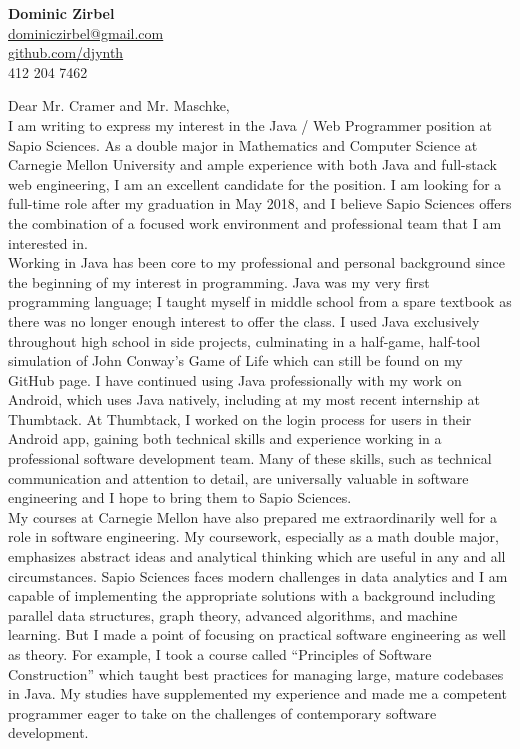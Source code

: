 \documentclass[letterpaper,10pt]{article}
\newcommand{\lb}{\vspace{14pt} \\}
\begin{document}
\thispagestyle{empty}

\begin{flushright}
    \textbf{\Large{Dominic Zirbel}} \\
    \href{mailto:dominiczirbel@gmail.com}{dominiczirbel@gmail.com} \\
    \href{https://github.com/djynth}{github.com/djynth} \\
    412 204 7462
\end{flushright}

\vspace{36pt}

Dear Mr. Cramer and Mr. Maschke,
\lb
I am writing to express my interest in the Java / Web Programmer position at Sapio Sciences. As a double major in Mathematics and Computer Science at Carnegie Mellon University and ample experience with both Java and full-stack web engineering, I am an excellent candidate for the position. I am looking for a full-time role after my graduation in May 2018, and I believe Sapio Sciences offers the combination of a focused work environment and professional team that I am interested in.
\lb
Working in Java has been core to my professional and personal background since the beginning of my interest in programming. Java was my very first programming language; I taught myself in middle school from a spare textbook as there was no longer enough interest to offer the class. I used Java exclusively throughout high school in side projects, culminating in a half-game, half-tool simulation of John Conway's Game of Life which can still be found on my GitHub page. I have continued using Java professionally with my work on Android, which uses Java natively, including at my most recent internship at Thumbtack. At Thumbtack, I worked on the login process for users in their Android app, gaining both technical skills and experience working in a professional software development team. Many of these skills, such as technical communication and attention to detail, are universally valuable in software engineering and I hope to bring them to Sapio Sciences.
\lb
My courses at Carnegie Mellon have also prepared me extraordinarily well for a role in software engineering. My coursework, especially as a math double major, emphasizes abstract ideas and analytical thinking which are useful in any and all circumstances. Sapio Sciences faces modern challenges in data analytics and I am capable of implementing the appropriate solutions with a background including parallel data structures, graph theory, advanced algorithms, and machine learning. But I made a point of focusing on practical software engineering as well as theory. For example, I took a course called ``Principles of Software Construction'' which taught best practices for managing large, mature codebases in Java. My studies have supplemented my experience and made me a competent programmer eager to take on the challenges of contemporary software development.
\end{document}
